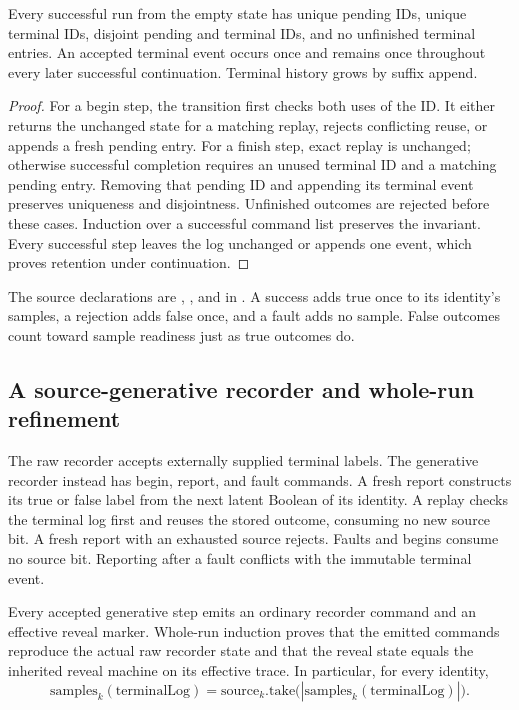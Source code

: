 \begin{theorem}
Every successful run from the empty state has unique pending IDs, unique
terminal IDs, disjoint pending and terminal IDs, and no unfinished terminal
entries. An accepted terminal event occurs once and remains once throughout
every later successful continuation. Terminal history grows by suffix append.
\end{theorem}
\begin{proof}
For a begin step, the transition first checks both uses of the ID. It either
returns the unchanged state for a matching replay, rejects conflicting reuse,
or appends a fresh pending entry. For a finish step, exact replay is unchanged;
otherwise successful completion requires an unused terminal ID and a matching
pending entry. Removing that pending ID and appending its terminal event
preserves uniqueness and disjointness. Unfinished outcomes are rejected before
these cases. Induction over a successful command list preserves the invariant.
Every successful step leaves the log unchanged or appends one event, which
proves retention under continuation.
\end{proof}

The source declarations are ,
, and
 in
. A success adds true once to its
identity's samples, a rejection adds false once, and a fault adds no sample.
False outcomes count toward sample readiness just as true outcomes do.

\subsection{A source-generative recorder and whole-run refinement}

The raw recorder accepts externally supplied terminal labels. The generative
recorder instead has begin, report, and fault commands. A fresh report constructs
its true or false label from the next latent Boolean of its identity. A replay
checks the terminal log first and reuses the stored outcome, consuming no new
source bit. A fresh report with an exhausted source rejects. Faults and begins
consume no source bit. Reporting after a fault conflicts with the immutable
terminal event.

Every accepted generative step emits an ordinary recorder command and an
effective reveal marker. Whole-run induction proves that the emitted commands
reproduce the actual raw recorder state and that the reveal state equals the
inherited reveal machine on its effective trace. In particular, for every
identity,
\begin{equation}
 \mathrm{samples}_k(\mathrm{terminalLog})
 =\mathrm{source}_k.\mathrm{take}
     \bigl(|\mathrm{samples}_k(\mathrm{terminalLog})|\bigr).
 \label{eq:recorder-prefix}
\end{equation}

